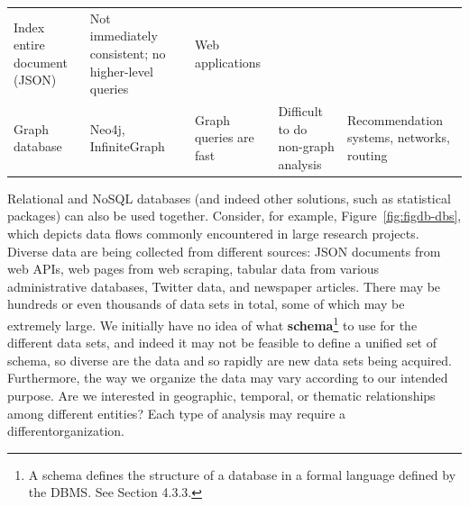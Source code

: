 \documentclass[]{krantz}
\begin{document}
\begin{longtable}[]{@{}lllll@{}}
\begin{minipage}[t]{0.22\columnwidth}
Index entire document (JSON)\strut
\end{minipage} & \begin{minipage}[t]{0.20\columnwidth}\raggedright\strut
Not immediately consistent; no higher-level queries\strut
\end{minipage} & \begin{minipage}[t]{0.21\columnwidth}\raggedright\strut
Web applications\strut
\end{minipage}\tabularnewline
\begin{minipage}[t]{0.07\columnwidth}\raggedright\strut
Graph database\strut
\end{minipage} & \begin{minipage}[t]{0.16\columnwidth}\raggedright\strut
Neo4j, InfiniteGraph\strut
\end{minipage} & \begin{minipage}[t]{0.22\columnwidth}\raggedright\strut
Graph queries are fast\strut
\end{minipage} & \begin{minipage}[t]{0.20\columnwidth}\raggedright\strut
Difficult to do non-graph analysis\strut
\end{minipage} & \begin{minipage}[t]{0.21\columnwidth}\raggedright\strut
Recommendation systems, networks, routing\strut
\end{minipage}\tabularnewline
\bottomrule
\end{longtable}

Relational and NoSQL databases (and indeed other solutions, such as
statistical packages) can also be used together. Consider, for example,
Figure~\ref{fig:figdb-dbs}, which depicts data flows commonly
encountered in large research projects. Diverse data are being collected
from different sources: JSON documents from web APIs, web pages from web
scraping, tabular data from various administrative databases, Twitter
data, and newspaper articles. There may be hundreds or even thousands of
data sets in total, some of which may be extremely large. We initially
have no idea of what \textbf{schema}\footnote{A schema defines the
  structure of a database in a formal language defined by the DBMS. See
  Section 4.3.3.} to use for the different data sets, and indeed it may
not be feasible to define a unified set of schema, so diverse are the
data and so rapidly are new data sets being acquired. Furthermore, the
way we organize the data may vary according to our intended purpose. Are
we interested in geographic, temporal, or thematic relationships among
different entities? Each type of analysis may require a
differentorganization.
\end{document}
